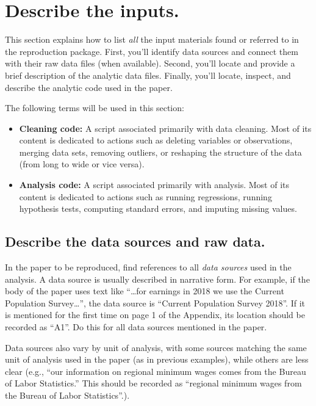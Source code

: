 \documentclass[]{book}
\begin{document}
\hypertarget{describe-inputs}{%
\section{Describe the inputs.}\label{describe-inputs}}

This section explains how to list \emph{all} the input materials found or referred to in the reproduction package. First, you'll identify data sources and connect them with their raw data files (when available). Second, you'll locate and provide a brief description of the analytic data files. Finally, you'll locate, inspect, and describe the analytic code used in the paper.

The following terms will be used in this section:

\begin{itemize}
\item
  \textbf{Cleaning code:} A script associated primarily with data cleaning. Most of its content is dedicated to actions such as deleting variables or observations, merging data sets, removing outliers, or reshaping the structure of the data (from long to wide or vice versa).
\item
  \textbf{Analysis code:} A script associated primarily with analysis. Most of its content is dedicated to actions such as running regressions, running hypothesis tests, computing standard errors, and imputing missing values.
\end{itemize}

\hypertarget{desc-sourc}{%
\subsection{Describe the data sources and raw data.}\label{desc-sourc}}

In the paper to be reproduced, find references to all \emph{data sources} used in the analysis. A data source is usually described in narrative form. For example, if the body of the paper uses text like ``\ldots{}for earnings in 2018 we use the Current Population Survey\ldots{}'', the data source is ``Current Population Survey 2018''. If it is mentioned for the first time on page 1 of the Appendix, its location should be recorded as ``A1''. Do this for all data sources mentioned in the paper.

Data sources also vary by unit of analysis, with some sources matching the same unit of analysis used in the paper (as in previous examples), while others are less clear (e.g., ``our information on regional minimum wages comes from the Bureau of Labor Statistics.'' This should be recorded as ``regional minimum wages from the Bureau of Labor Statistics''.).
\end{document}
